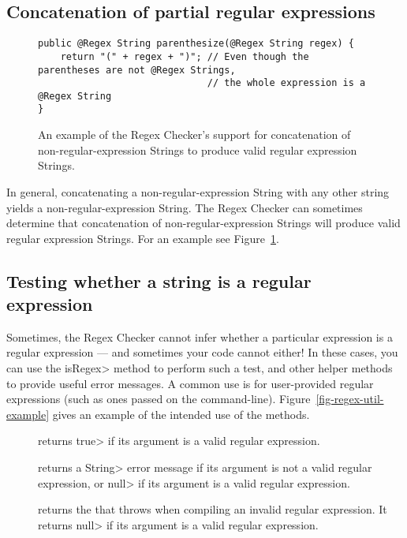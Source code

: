 \subsection{Concatenation of partial regular expressions\label{regex-partial-regex}}

\begin{figure}
\begin{Verbatim}
public @Regex String parenthesize(@Regex String regex) {
    return "(" + regex + ")"; // Even though the parentheses are not @Regex Strings,
                              // the whole expression is a @Regex String
}
\end{Verbatim}
\caption{An example of the Regex Checker's support for concatenation
of non-regular-expression Strings to produce valid regular expression Strings.}
\label{fig-regex-partial}
\end{figure}

In general, concatenating a non-regular-expression String with any other
string yields a non-regular-expression String.  The Regex Checker can
sometimes determine that concatenation of non-regular-expression Strings
will produce valid regular expression Strings. For an example see
Figure~\ref{fig-regex-partial}.


\subsection{Testing whether a string is a regular expression\label{regexutil-methods}}

Sometimes, the Regex Checker cannot infer whether a particular expression
is a regular expression --- and sometimes your code cannot either!  In
these cases, you can use the \<isRegex> method to perform such a test, and
other helper methods to provide useful error messages.  A
common use is for user-provided regular expressions (such as ones passed
on the command-line).
Figure~\ref{fig-regex-util-example} gives an
example of the intended use of the  methods.

\begin{description}

\item[]
  returns \<true> if its argument is a valid regular expression.

\item[]
  returns a \<String> error message if its argument is not a valid regular
  expression, or \<null> if its argument is a valid regular expression.

\item[]
  returns the
  that 
  throws when compiling an invalid regular expression.  It returns \<null>
  if its argument is a valid regular expression.

\end{description}

